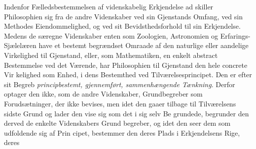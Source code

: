 \documentclass[12pt,a4paper]{book}
\begin{document}
%
Indenfor Fælledsbestemmelsen af videnskabelig Erkjendelse ad\-%
skiller Philosophien sig fra de andre Videnskaber ved sin
Gjenstands Omfang, ved sin Methodes Eiendommelighed, og
ved sit Bevidsthedsforhold til sin Erkjendelse. Medens de
særegne Videnskaber enten som Zoologien, Astronomien og
Erfarings-Sjælelæren have et bestemt begrændset Omraade af
den naturlige eller aandelige Virkelighed til Gjenstand, eller,
som Mathematiken, en enkelt abstract Bestemmelse ved det
Værende, har Philosophien til Gjenstand den hele concrete Vir\-%
kelighed som Enhed, i dens Bestemthed ved Tilværelsesprincipet.
Den er efter sit Begreb \emph{principbestemt, gjennemført,
sammenhængende Tænkning}. Derfor optager den ikke,
som de andre Videnskaber, Grundbegreber som Forudsætninger,
der ikke bevises, men idet den gaaer tilbage til Tilværelsens
sidste Grund og lader den vise sig som det i sig selv Be\-%
grundede, begrunder den derved de enkelte Videnskabers Grund\-%
begreber, og idet den seer dem som udfoldende sig af Prin\-%
cipet, bestemmer den deres Plads i Erkjendelsens Rige, deres
\end{document}
